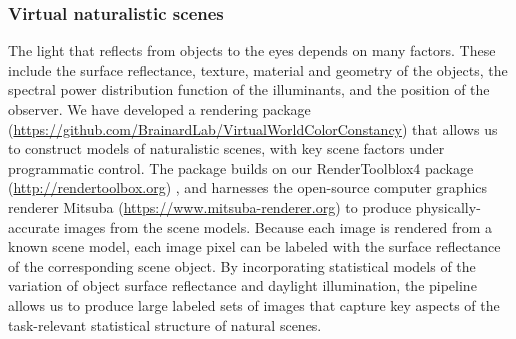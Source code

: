 \documentclass{jov}
\begin{document}
\subsubsection{Virtual naturalistic scenes}
The light that reflects from objects to the eyes depends on many factors.
These include the surface reflectance, texture, material and geometry of the objects, 
the spectral power distribution function of the illuminants, and the position of the observer.
We have developed a rendering package 
(\href{https://github.com/BrainardLab/VirtualWorldColorConstancy}{https://github.com/BrainardLab/VirtualWorldColorConstancy}) 
that allows us to construct models of naturalistic scenes, with key scene factors under programmatic control.
The package builds on our RenderToolblox4 package (\href{http://rendertoolbox.org}{http://rendertoolbox.org}) \cite{heasly2014rendertoolbox3},
and harnesses the open-source computer graphics renderer Mitsuba (\href{https://www.mitsuba-renderer.org}{https://www.mitsuba-renderer.org})
\cite{jakob2015mitsuba} to produce physically-accurate images from the scene models.
Because each image is rendered from a known scene model, each image pixel can be labeled with 
the surface reflectance of the corresponding scene object.
By incorporating statistical models of the variation of object surface reflectance and daylight illumination, 
the pipeline allows us to produce large labeled sets of images that capture key aspects of the task-relevant 
statistical structure of natural scenes.
\end{document}
